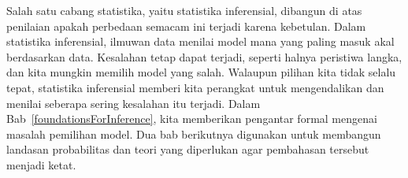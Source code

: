 
Salah satu cabang statistika, yaitu statistika inferensial, dibangun
di atas penilaian apakah perbedaan semacam ini terjadi karena kebetulan.
Dalam statistika inferensial, ilmuwan data menilai model mana yang
paling masuk akal berdasarkan data.
Kesalahan tetap dapat terjadi, seperti halnya peristiwa langka,
dan kita mungkin memilih model yang salah.
Walaupun pilihan kita tidak selalu tepat, statistika inferensial
memberi kita perangkat untuk mengendalikan dan menilai seberapa
sering kesalahan itu terjadi.
Dalam Bab~\ref{foundationsForInference},
kita memberikan pengantar formal mengenai masalah pemilihan model.
Dua bab berikutnya digunakan untuk membangun landasan probabilitas
dan teori yang diperlukan agar pembahasan tersebut menjadi ketat.



{}
